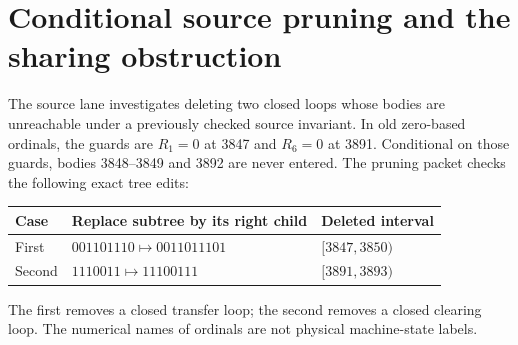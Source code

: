 \documentclass[11pt,letterpaper]{article}
\begin{document}
\section{Conditional source pruning and the sharing obstruction}
The source lane investigates deleting two closed loops whose bodies are
unreachable under a previously checked source invariant. In old zero-based
ordinals, the guards are $R_1=0$ at 3847 and $R_6=0$ at 3891. Conditional on
those guards, bodies 3848--3849 and 3892 are never entered. The pruning packet
checks the following exact tree edits:
\begin{center}\begin{tabular}{lll}\toprule
Case & Replace subtree by its right child & Deleted interval\\\midrule
First & $001101110\mapsto0011011101$ & $[3847,3850)$\\
Second & $1110011\mapsto11100111$ & $[3891,3893)$\\\bottomrule
\end{tabular}\end{center}
The first removes a closed transfer loop; the second removes a closed clearing
loop. The numerical names of ordinals are not physical machine-state labels.
\end{document}
